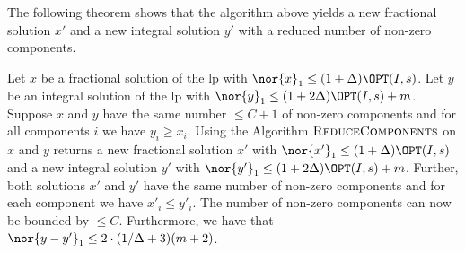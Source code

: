 The following theorem shows that the algorithm above yields a new fractional solution $x'$ and a new integral solution $y'$ with a reduced number of non-zero components.
\begin{theorem}
\label{thm:reduce}
    Let $x$ be a fractional solution of the \ac{lp} with	$\nor{x}_1 \leq (1+ \Delta) \OPT(I,s)$. Let $y$ be an integral solution of the \ac{lp} with $\nor{y}_1 \leq (1+ 2\Delta) \OPT(I,s)+m$. Suppose $x$ and $y$ have the same number $\leq C+1$ of non-zero components and for all components $i$ we have
	$y_i \geq x_i$.	Using the Algorithm $\textsc{ReduceComponents}$ on $x$ and $y$ returns a new fractional solution $x'$ with $\nor{x'}_1 \leq (1+ \Delta) \OPT(I,s)$ and a new integral solution $y'$ with $\nor{y'}_1 \leq (1+ 2 \Delta) \OPT(I,s) +m$. Further, both solutions $x'$ and $y'$ have the same number of non-zero components and for each component we have $x'_i \leq y'_i$. The number of non-zero components can now be bounded by $\leq C$. Furthermore, we have that $\nor{y-y'}_1 \leq 2\cdot (1/\Delta +3) (m+2)$.
\end{theorem}
